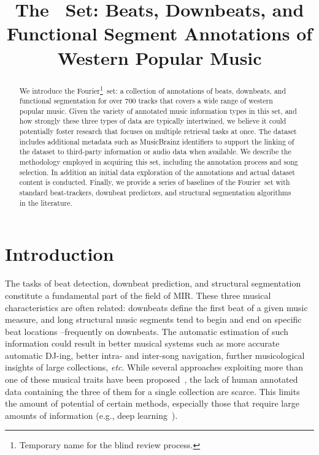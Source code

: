 \documentclass{article}
\title{The \setNameUpper~Set: Beats, Downbeats, and Functional Segment Annotations of Western Popular Music}
\newcommand{\setName}{Fourier}
\begin{document}
%
\maketitle
%
\begin{abstract}
    We introduce the \setName\footnote{Temporary name for the blind review process.}~set: a collection of annotations of beats, downbeats, and functional segmentation for over 700 tracks that covers a wide range of western popular music.
    Given the variety of annotated music information types in this set, and how strongly these three types of data are typically intertwined, we believe it could potentially foster research that focuses on multiple retrieval tasks at once.
    The dataset includes additional metadata such as MusicBrainz identifiers to support the linking of the dataset to third-party information or audio data when available.
    We describe the methodology employed in acquiring this set, including the annotation process and song selection. 
    In addition an initial data exploration of the annotations and actual dataset content is conducted. 
    Finally, we provide a series of baselines of the \setName~set with standard beat-trackers, downbeat predictors, and structural segmentation algorithms in the literature.
\end{abstract}
%
\section{Introduction}\label{sec:introduction}

The tasks of beat detection, downbeat prediction, and structural segmentation~\cite{Paulus2010} constitute a fundamental part of the field of MIR.
These three musical characteristics are often related: downbeats define the first beat of a given music measure, and long structural music segments tend to begin and end on specific beat locations --frequently on downbeats.
The automatic estimation of such information could result in better musical systems such as more accurate automatic DJ-ing, better intra- and inter-song navigation, further musicological insights of large collections, \emph{etc}.
While several approaches exploiting more than one of these musical traits have been proposed~\cite{Bock2016, Mccallum2019, Fuentes2019}, the lack of human annotated data containing the three of them for a single collection are scarce.
This limits the amount of potential of certain methods, especially those that require large amounts of information (e.g., deep learning~\cite{Humphrey2012}).
\end{document}
